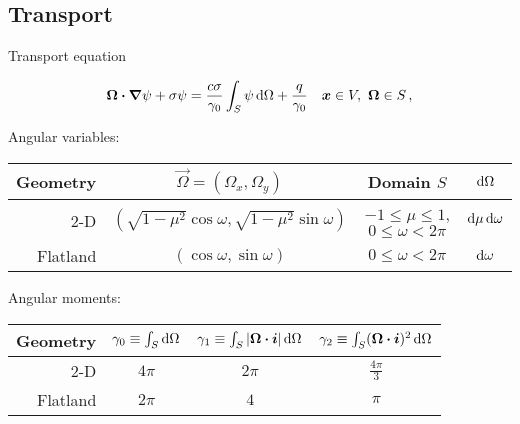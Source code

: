 \documentclass[draft]{beamer}
\begin{document}
\subsection{Transport}
\begin{frame}{Transport equation}

\begin{equation}\label{eq:generalTransport}
  \bm{\Omega}\bm{\cdot} \bm{\nabla} \psi + \sigma \psi
  = \frac{c \sigma}{\gamma_0} \int_{S} \psi \mathop{}\!\mathrm{d}\Omega + \frac{q}{\gamma_0}
  \quad \bm{x}\in V,\ \bm{\Omega}\in S \,,
\end{equation}

  \vspace{2ex}

  \small
  \centering
  Angular variables:
  \begin{tabular}{rccc}
\toprule
   Geometry & $\vec{\Omega}=(\Omega_x, \Omega_y)$ & Domain $S$ & $\mathop{}\!\mathrm{d}\Omega$
\\ \midrule
2-D & $( \sqrt{1-\mu^2} \cos \omega,
   \sqrt{1-\mu^2} \sin \omega)$
   & $-1 \le \mu \le 1$, $0 \le \omega < 2\pi$ & $\mathop{}\!\mathrm{d}\mu \mathop{}\!\mathrm{d} \omega$
   \\
   Flatland & $ ( \cos \omega, \sin \omega )$
   & $0 \le \omega < 2\pi$ & $\mathop{}\!\mathrm{d} \omega$
\\ \bottomrule
  \end{tabular}

  \vspace{2ex}

Angular moments:
  \centering
  \begin{tabular}{rccc}
\toprule
   Geometry
   & $\gamma_0 \equiv \int_S \mathop{}\!\mathrm{d}\Omega$
   & $\gamma_1 \equiv \int_S \left| \bm{\Omega}\bm{\cdot}\bm{i} \right| \mathop{}\!\mathrm{d}\Omega$
   & $\gamma_2 \equiv \int_S (\bm{\Omega}\bm{\cdot}\bm{i})^2 \mathop{}\!\mathrm{d}\Omega$
\\ \midrule
   2-D & $4\pi$ & $2\pi$ & $\frac{4\pi}{3}$
   \\
   Flatland & $2\pi$ & $4$ & $\pi$
\\ \bottomrule
  \end{tabular}

\end{frame}
\end{document}
